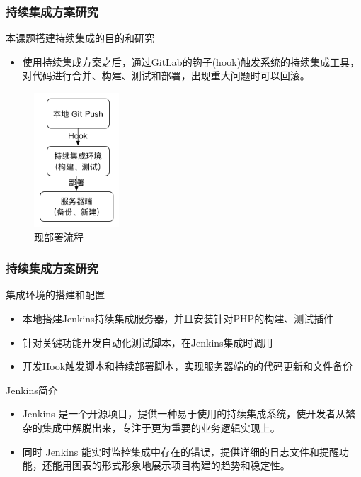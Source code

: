 \documentclass{beamer}
\begin{document}
\begin{frame}
\frametitle{持续集成方案研究}
  \begin{block}{本课题搭建持续集成的目的和研究}
    \begin{itemize}
      \item 使用持续集成方案之后，通过GitLab的钩子(hook)触发系统的持续集成工具，对代码进行合并、构建、测试和部署，出现重大问题时可以回滚。
    \end{itemize} 
  \end{block}
  \begin{figure}
    \centering
      \includegraphics[height=5cm]{./img/jenkins2.png}
    \caption{现部署流程}
    \label{fig:visual}
  \end{figure}
\end{frame}

\begin{frame}
\frametitle{持续集成方案研究}
  \begin{block}{集成环境的搭建和配置}
    \begin{itemize}
      \item 本地搭建Jenkins持续集成服务器，并且安装针对PHP的构建、测试插件
      \item 针对关键功能开发自动化测试脚本，在Jenkins集成时调用 
      \item 开发Hook触发脚本和持续部署脚本，实现服务器端的的代码更新和文件备份 
    \end{itemize} 
  \end{block}
  \begin{block}{Jenkins简介}
    \begin{itemize}
      \item Jenkins 是一个开源项目，提供一种易于使用的持续集成系统，使开发者从繁杂的集成中解脱出来，专注于更为重要的业务逻辑实现上。
      \item 同时 Jenkins 能实时监控集成中存在的错误，提供详细的日志文件和提醒功能，还能用图表的形式形象地展示项目构建的趋势和稳定性。
    \end{itemize} 
  \end{block}
\end{frame}
\end{document}

